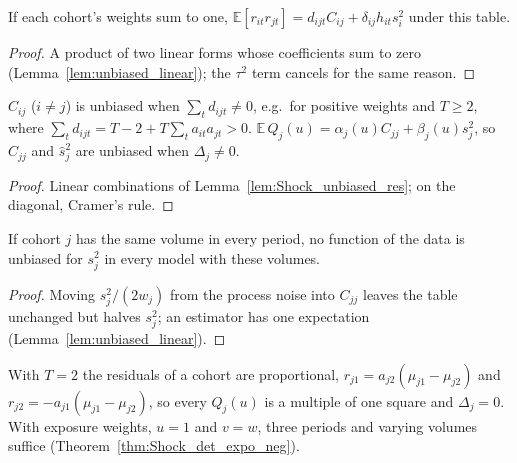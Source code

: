 \begin{lemma}\label{lem:Shock_unbiased_res}
  \leanok
  If each cohort's weights sum to one,
  $\mathbb E[r_{it}r_{jt}] = d_{ijt}C_{ij} + \delta_{ij}h_{it}s_i^2$ under this table.
\end{lemma}
\begin{proof}
  \leanok
  A product of two linear forms whose coefficients sum to zero
  (Lemma~\ref{lem:unbiased_linear}); the $\tau^2$ term cancels for the same reason.
\end{proof}

\begin{theorem}\label{thm:Shock_unbiased}
  \leanok
  $\hat C_{ij}$ ($i \ne j$) is unbiased when $\sum_t d_{ijt} \ne 0$, e.g.\ for positive
  weights and $T \ge 2$, where $\sum_t d_{ijt} = T - 2 + T\sum_t a_{it}a_{jt} > 0$.
  $\mathbb E\,Q_j(u) = \alpha_j(u)C_{jj} + \beta_j(u)s_j^2$, so $\hat C_{jj}$ and
  $\hat s_j^2$ are unbiased when $\Delta_j \ne 0$.
\end{theorem}
\begin{proof}
  \leanok
  Linear combinations of Lemma~\ref{lem:Shock_unbiased_res}; on the diagonal, Cramer's rule.
\end{proof}

\begin{theorem}\label{thm:Shock_not_unbiased}
  \leanok
  If cohort $j$ has the same volume in every period, no function of the data is unbiased for
  $s_j^2$ in every model with these volumes.
\end{theorem}
\begin{proof}
  \leanok
  Moving $s_j^2/(2w_j)$ from the process noise into $C_{jj}$ leaves the table unchanged but
  halves $s_j^2$; an estimator has one expectation (Lemma~\ref{lem:unbiased_linear}).
\end{proof}

\begin{remark}\label{rem:Shock_two_periods}
  With $T = 2$ the residuals of a cohort are proportional,
  $r_{j1} = a_{j2}(\mu_{j1} - \mu_{j2})$ and $r_{j2} = -a_{j1}(\mu_{j1} - \mu_{j2})$, so every
  $Q_j(u)$ is a multiple of one square and $\Delta_j = 0$. With exposure weights,
  $u = 1$ and $v = w$, three periods and varying volumes suffice
  (Theorem~\ref{thm:Shock_det_expo_neg}).
\end{remark}

